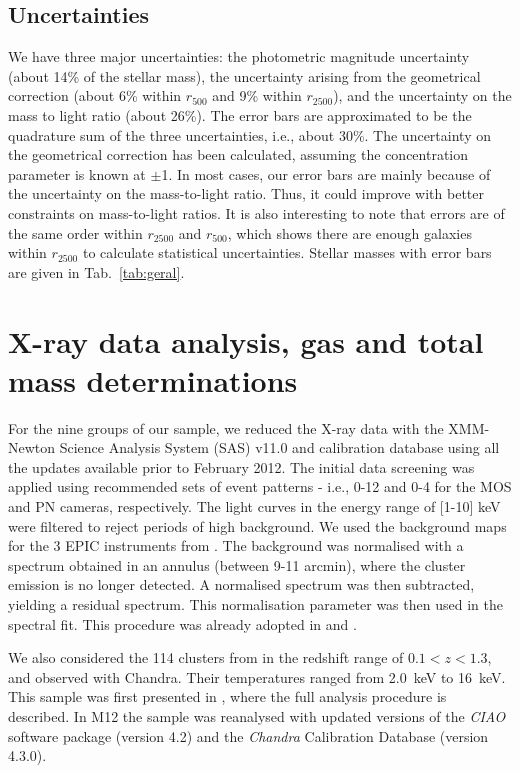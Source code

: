 \documentclass{aa}
\begin{document}
  \subsection{Uncertainties}
  
  We have three major uncertainties:  the photometric
  magnitude uncertainty (about 14\% of the stellar mass), the
  uncertainty arising from the geometrical correction (about 6\%
  within $r_{500}$ and 9\% within $r_{2500}$), and the uncertainty on
  the mass to light ratio (about 26\%). The error bars are
  approximated to be the quadrature sum of the three uncertainties,
  i.e., about 30\%. The uncertainty on the geometrical correction has
  been calculated, assuming the concentration parameter is known at
  $\pm$1. In most cases, our error bars are mainly because of the
  uncertainty on the mass-to-light ratio. Thus, it could improve with
  better constraints on mass-to-light ratios. It is also interesting
  to note that errors are of the same order within $r_{2500}$ and
  $r_{500}$, which shows there are enough galaxies within $r_{2500}$ to
  calculate statistical uncertainties. Stellar masses with error bars
  are given in Tab.~\ref{tab:geral}.

\section{X-ray data analysis, gas and total mass determinations}
\label{rx}

For the nine groups of our sample, we reduced the X-ray data with the
XMM-Newton Science Analysis System (SAS) v11.0 and calibration
database using all the updates available prior to February 2012.  The
initial data screening was applied using recommended sets of event
patterns - i.e., 0-12 and 0-4 for the MOS and PN cameras, respectively.  The
light curves in the energy range of [1-10] keV were filtered to reject
periods of high background.  We used the background maps for the 3
EPIC instruments from \citet{RP03}. The background was normalised with
a spectrum obtained in an annulus (between 9-11 arcmin), where the
cluster emission is no longer detected. A normalised spectrum was then
subtracted, yielding a residual spectrum. This normalisation parameter
was then used in the spectral fit.
This procedure was already
adopted in \citet{lagana08} and \citet{durret10,durret11}.

We also considered the 114 clusters from \citet{M12}
in the redshift range of $0.1 < z < 1.3$, and observed with Chandra.
Their temperatures ranged from 2.0~keV to 16~keV.  This sample was first 
presented in
\citet{M08}, where the full analysis procedure is described. In M12
the sample was reanalysed with updated versions of the \textit{CIAO}
software package (version 4.2) and the \textit{Chandra} Calibration
Database (version 4.3.0).
\end{document}
